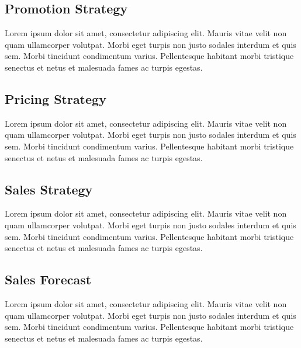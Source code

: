 \documentclass[11pt,titlepage]{article}
\begin{document}
\subsection{Promotion  Strategy}
Lorem ipsum dolor sit amet, consectetur adipiscing elit. Mauris vitae velit 
non quam ullamcorper volutpat. Morbi eget turpis non justo sodales interdum 
et quis sem. Morbi tincidunt condimentum varius. Pellentesque habitant morbi 
tristique senectus et netus et malesuada fames ac turpis egestas.\newline

\subsection{Pricing Strategy}
Lorem ipsum dolor sit amet, consectetur adipiscing elit. Mauris vitae velit 
non quam ullamcorper volutpat. Morbi eget turpis non justo sodales interdum 
et quis sem. Morbi tincidunt condimentum varius. Pellentesque habitant morbi 
tristique senectus et netus et malesuada fames ac turpis egestas.\newline

\subsection{Sales Strategy}
Lorem ipsum dolor sit amet, consectetur adipiscing elit. Mauris vitae velit 
non quam ullamcorper volutpat. Morbi eget turpis non justo sodales interdum 
et quis sem. Morbi tincidunt condimentum varius. Pellentesque habitant morbi 
tristique senectus et netus et malesuada fames ac turpis egestas.\newline

\subsection{Sales Forecast}
Lorem ipsum dolor sit amet, consectetur adipiscing elit. Mauris vitae velit 
non quam ullamcorper volutpat. Morbi eget turpis non justo sodales interdum 
et quis sem. Morbi tincidunt condimentum varius. Pellentesque habitant morbi 
tristique senectus et netus et malesuada fames ac turpis egestas.\newline
\pagebreak
\end{document}
